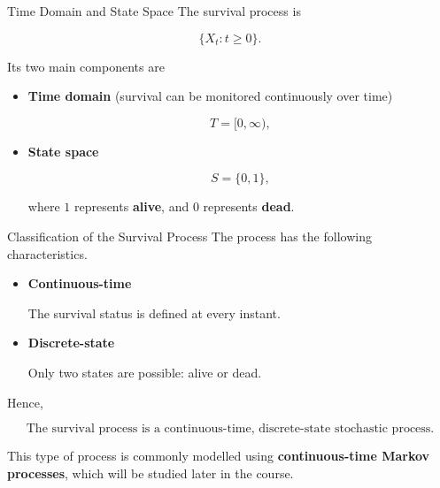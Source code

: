 \documentclass[
  ignorenonframetext,
  aspectratio=169,
]{beamer}
\begin{document}
\begin{frame}{Time Domain and State Space}
\protect{}\label{time-domain-and-state-space-2}
The survival process is

\[
\{X_t:t\ge0\}.
\]

Its two main components are

\begin{itemize}
\item
  \textbf{Time domain} (survival can be monitored continuously over
  time)

  \[
  T=[0,\infty),
  \]
\item
  \textbf{State space}

  \[
  S=\{0,1\},
  \]

  where \(1\) represents \textbf{alive}, and \(0\) represents
  \textbf{dead}.
\end{itemize}
\end{frame}

\begin{frame}{Classification of the Survival Process}
\protect{}\label{classification-of-the-survival-process}
The process has the following characteristics.

\begin{itemize}
\item
  \textbf{Continuous-time}

  The survival status is defined at every instant.
\item
  \textbf{Discrete-state}

  Only two states are possible: alive or dead.
\end{itemize}

Hence,

\[
\boxed{\text{The survival process is a continuous-time, discrete-state stochastic process.}}
\]

This type of process is commonly modelled using \textbf{continuous-time
Markov processes}, which will be studied later in the course.
\end{frame}
\end{document}
